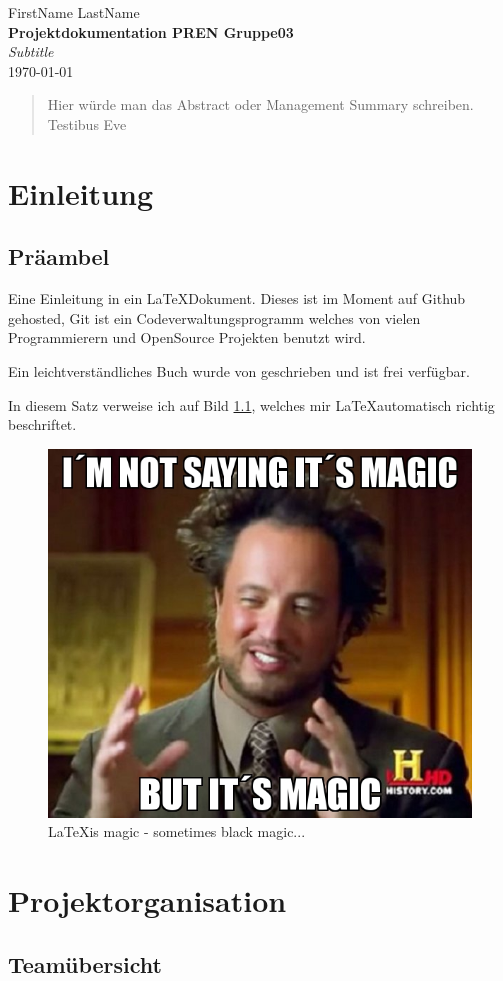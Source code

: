 \documentclass[a4paper]{report}
\newcommand*{\titleAP}{\begingroup %
	\centering
	\vspace*{\baselineskip} %
	
	{\Large FirstName LastName}\\[0.167\textheight] %
	
	{\Huge\bfseries Projektdokumentation PREN Gruppe03}\\[\baselineskip]
	
	{\Large \textit{Subtitle}}\\
	\today
	
	\vspace*{3\baselineskip} %
	\endgroup}
\begin{document}
\titleAP

\newpage

\begin{abstract}
	Hier würde man das Abstract oder Management Summary schreiben.
	Testibus Eve
\end{abstract}

\tableofcontents

\newpage

\chapter{Einleitung}
\label{ch:Intro}

\section{Präambel}
Eine Einleitung in ein \LaTeX Dokument. 
Dieses ist im Moment auf Github gehosted, Git ist ein Codeverwaltungsprogramm welches von vielen Programmierern und OpenSource Projekten benutzt wird. \parencite{Git2017}

Ein leichtverständliches Buch wurde von \citeauthor{Chacon2016} geschrieben und ist frei verfügbar.

In diesem Satz verweise ich auf Bild \ref{fig:MemeMagic}, welches mir \LaTeX automatisch richtig beschriftet.

\begin{figure}[h!]
	\centering
	\includegraphics[width=0.5\linewidth,keepaspectratio]{MemeMagic}
	\caption{\LaTeX is magic - sometimes black magic...}
	\label{fig:MemeMagic}
	
\end{figure}

\chapter{Projektorganisation}

\section{Teamübersicht}
\end{document}
